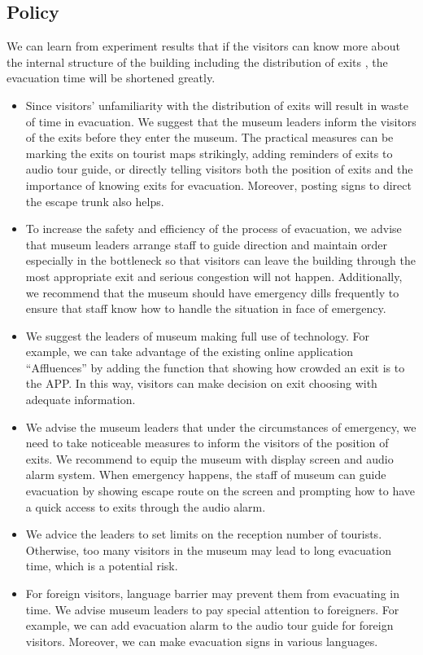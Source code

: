 \documentclass{mcmthesis}
\begin{document}
\subsection{Policy}
We can learn from experiment results that if the visitors can know more about the internal structure of the building including the distribution of exits , the evacuation time will be shortened greatly. 
\begin{itemize}
\item
Since visitors’ unfamiliarity with the distribution of exits will result in waste of time in evacuation. We suggest that the museum leaders inform the visitors of the exits before they enter the museum. The practical measures can be marking the exits on tourist maps strikingly, adding reminders of exits to audio tour guide, or directly telling visitors both the position of exits and the importance of knowing exits for evacuation. Moreover, posting signs to direct the escape trunk also helps.
\item 
To increase the safety and efficiency of the process of evacuation, we advise that museum leaders arrange staff to guide direction and maintain order especially in the bottleneck so that visitors can leave the building through the most appropriate exit and serious congestion will not happen. Additionally, we recommend that the museum should have emergency dills frequently to ensure that staff know how to handle the situation in face of emergency.
\item 
We suggest the leaders of museum making full use of technology. For example, we can take advantage of the existing online application “Affluences” by adding the function that showing how crowded an exit is to the APP. In this way, visitors can make decision on exit choosing with adequate information.
\item
We advise the museum leaders that under the circumstances of emergency, we need to take noticeable measures to inform the visitors of the position of exits. We recommend to equip the museum with display screen and audio alarm system. When emergency happens, the staff of museum can guide evacuation by showing escape route on the screen and prompting how to have a quick access to exits through the audio alarm.
\item
We advice the leaders to set limits on the reception number of tourists. Otherwise, too many visitors in the museum may lead to long evacuation time, which is a potential risk.
\item
For foreign visitors, language barrier may prevent them from evacuating in time. We advise museum leaders to pay special attention to foreigners. For example, we can add evacuation alarm to the audio tour guide for foreign visitors. Moreover, we can make evacuation signs in various languages.
\end{itemize}
\end{document}
